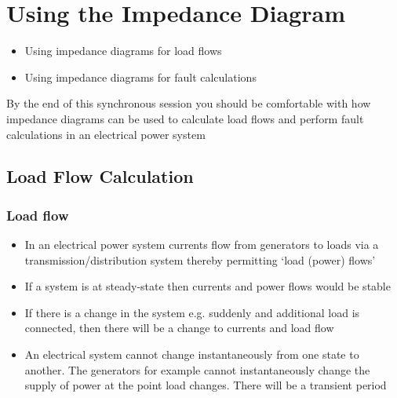 \chapter{Using the Impedance Diagram}
\begin{itemize}
	\item Using impedance diagrams for load flows
	\item Using impedance diagrams for fault calculations
\end{itemize}
\begin{quoting}
	By the end of this synchronous session you should be comfortable with how impedance diagrams can be used to calculate load flows and perform fault calculations in an electrical power system
\end{quoting}
\section{Load Flow Calculation}
\subsection{Load flow}
\begin{itemize}
	\item In an electrical power system currents flow from generators to loads via a transmission/distribution system thereby permitting `load (power) flows'
	\item If a system is at steady-state then currents and power flows would be stable
	\item If there is a change in the system e.g. suddenly and additional load is connected, then there will be a change to currents and load flow
	\item An electrical system cannot change instantaneously from one state to another. The generators for example cannot instantaneously change the supply of power at the point load changes. There will be a transient period
\end{itemize}
